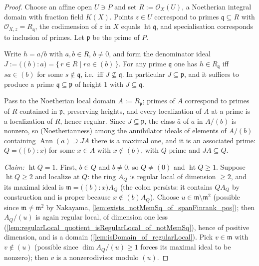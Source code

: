 \begin{proof}
  \leanok
  Choose an affine open \(U \ni P\) and set \(R := \mathcal O_X(U)\), a Noetherian
  integral domain with fraction field \(K(X)\). Points \(z \in U\) correspond to primes
  \(\mathfrak q \subseteq R\) with \(\mathcal O_{X, z} = R_{\mathfrak q}\), the
  codimension of \(z\) in \(X\) equals \(\operatorname{ht} \mathfrak q\), and
  specialisation corresponds to inclusion of primes. Let \(\mathfrak p\) be the prime
  of \(P\).

  Write \(h = a/b\) with \(a, b \in R\), \(b \neq 0\), and form the denominator ideal
  \(J := \bigl((b) : a\bigr) = \{\, r \in R \mid r a \in (b) \,\}\). For any prime
  \(\mathfrak q\) one has \(h \in R_{\mathfrak q}\) iff \(s a \in (b)\) for some
  \(s \notin \mathfrak q\), i.e.\ iff \(J \not\subseteq \mathfrak q\). In particular
  \(J \subseteq \mathfrak p\), and it suffices to produce a prime
  \(\mathfrak q \subseteq \mathfrak p\) of height \(1\) with \(J \subseteq \mathfrak q\).

  Pass to the Noetherian local domain \(A := R_{\mathfrak p}\); primes of \(A\)
  correspond to primes of \(R\) contained in \(\mathfrak p\), preserving heights, and
  every localization of \(A\) at a prime is a localization of \(R\), hence regular.
  Since \(J \subseteq \mathfrak p\), the class \(\bar a\) of \(a\) in \(A/(b)\) is
  nonzero, so (Noetherianness) among the annihilator ideals of elements of \(A/(b)\)
  containing \(\operatorname{Ann}(\bar a) \supseteq J A\) there is a maximal one, and it
  is an associated prime: \(Q = \bigl((b) : x\bigr)\) for some \(x \in A\) with
  \(x \notin (b)\), with \(Q\) prime and \(J A \subseteq Q\).

  \emph{Claim: \(\operatorname{ht} Q = 1\).} First, \(b \in Q\) and \(b \neq 0\), so
  \(Q \neq (0)\) and \(\operatorname{ht} Q \geq 1\). Suppose
  \(\operatorname{ht} Q \geq 2\) and localize at \(Q\): the ring \(A_Q\) is regular
  local of dimension \(\geq 2\), and its maximal ideal is
  \(\mathfrak m = \bigl((b) : x\bigr) A_Q\) (the colon persists: it contains \(Q A_Q\)
  by construction and is proper because \(x \notin (b) A_Q\)). Choose
  \(u \in \mathfrak m \setminus \mathfrak m^2\) (possible since
  \(\mathfrak m \neq \mathfrak m^2\) by Nakayama,
  \cref{lem:exists_notMemSq_of_spanFinrank_pos}); then \(A_Q / (u)\) is again regular
  local, of dimension one less
  (\cref{lem:regularLocal_quotient_isRegularLocal_of_notMemSq}), hence of positive
  dimension, and is a domain (\cref{lem:isDomain_of_regularLocal}). Pick
  \(v \in \mathfrak m\) with \(v \notin (u)\) (possible since
  \(\dim A_Q/(u) \geq 1\) forces its maximal ideal to be nonzero); then
  \(v\) is a nonzerodivisor modulo \((u)\).


\end{proof}

